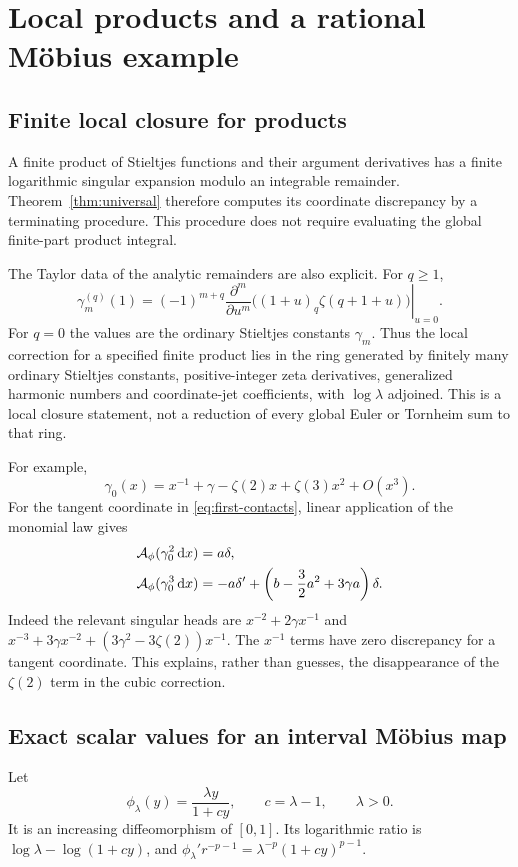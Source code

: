 \documentclass[11pt]{article}
\theoremstyle{definition}\newtheorem{definition}[theorem]{Definition}
\theoremstyle{remark}\newtheorem{remark}[theorem]{Remark}
\newcommand{\dd}{\,\mathrm d}
\newcommand{\Ac}{\mathcal A}
\begin{document}
\section{Local products and a rational M\"obius example}
\label{sec:products}
\subsection{Finite local closure for products}
A finite product of Stieltjes functions and their argument derivatives has a finite logarithmic singular expansion modulo an integrable remainder. Theorem~\ref{thm:universal} therefore computes its coordinate discrepancy by a terminating procedure. This procedure does not require evaluating the global finite-part product integral.

The Taylor data of the analytic remainders are also explicit. For $q\ge1$,
\begin{equation}\label{eq:shifted-Taylor}
\gamma_m^{(q)}(1)
=(-1)^{m+q}\left.\frac{\partial^m}{\partial u^m}
\bigl((1+u)_q\zeta(q+1+u)\bigr)\right|_{u=0}.
\end{equation}
For $q=0$ the values are the ordinary Stieltjes constants $\gamma_m$. Thus the local correction for a specified finite product lies in the ring generated by finitely many ordinary Stieltjes constants, positive-integer zeta derivatives, generalized harmonic numbers and coordinate-jet coefficients, with $\log\lambda$ adjoined. This is a local closure statement, not a reduction of every global Euler or Tornheim sum to that ring.

For example,
\[
\gamma_0(x)=x^{-1}+\gamma-\zeta(2)x+\zeta(3)x^2+O(x^3).
\]
For the tangent coordinate in \eqref{eq:first-contacts}, linear application of the monomial law gives
\begin{align}\label{eq:products-explicit}
\Ac_\phi(\gamma_0^2\dd x)&=a\delta,\\
\Ac_\phi(\gamma_0^3\dd x)&=-a\delta'
+\left(b-\frac32a^2+3\gamma a\right)\delta.\notag
\end{align}
Indeed the relevant singular heads are
$x^{-2}+2\gamma x^{-1}$ and
$x^{-3}+3\gamma x^{-2}+(3\gamma^2-3\zeta(2))x^{-1}$.
The $x^{-1}$ terms have zero discrepancy for a tangent coordinate. This explains, rather than guesses, the disappearance of the $\zeta(2)$ term in the cubic correction.

\subsection{Exact scalar values for an interval M\"obius map}
Let
\begin{equation}\label{eq:interval-mobius}
\phi_\lambda(y)=\frac{\lambda y}{1+cy},\qquad c=\lambda-1,\qquad\lambda>0.
\end{equation}
It is an increasing diffeomorphism of $[0,1]$. Its logarithmic ratio is
$\log\lambda-\log(1+cy)$, and
$\phi_\lambda' r^{-p-1}=\lambda^{-p}(1+cy)^{p-1}$.
\end{document}
